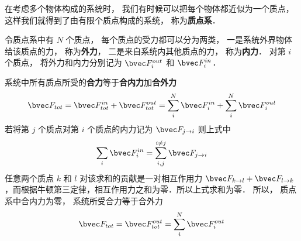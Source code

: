 

在考虑多个物体构成的系统时， 我们有时候可以把每个物体都近似为一个质点， 这样我们就得到了由有限个质点构成的系统， 称为\textbf{质点系}．

令质点系中有 $N$ 个质点， 每个质点的受力都可以分为两类， 一是系统外界物体给该质点的力， 称为\textbf{外力}， 二是来自系统内其他质点的力， 称为\textbf{内力}． 对第 $i$ 个质点， 将外力和内力分别记为 $\bvec F_i^{out}$ 和 $\bvec F_i^{in}$． 

系统中所有质点所受的\textbf{合力}等于\textbf{合内力}加\textbf{合外力}
\begin{equation}
\bvec F_{tot} = \bvec F_{tot}^{in} + \bvec F_{tot}^{out} = \sum_i^N \bvec F_i^{in} + \sum_i^N \bvec F_i^{out}
\end{equation}
若将第 $j$ 个质点对第 $i$ 个质点的内力记为 $\bvec F_{j\to i}$ 则上式中
\begin{equation}
\sum_i \bvec F_i^{in} = \sum_{i,j}^{i \ne j} \bvec F_{j \to i}
\end{equation}
任意两个质点 $k$ 和 $l$ 对该求和的贡献是一对相互作用力 $\bvec F_{k \to l} + \bvec F_{l \to k}$，而根据牛顿第三定律，相互作用力之和为零．所以上式求和为零． 所以， 质点系中合内力为零， 系统所受合力等于合外力
\begin{equation}
\bvec F_{tot} = \bvec F_{tot}^{out} = \sum_i^N \bvec F_i^{out}
\end{equation}